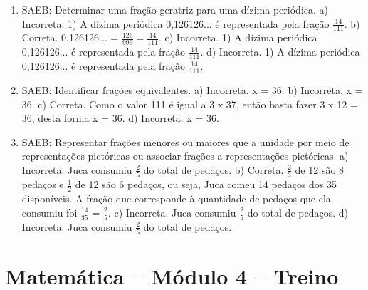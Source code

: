 \begin{enumerate}
\item
SAEB: Determinar uma fração geratriz para uma dízima periódica.
a) Incorreta. 1)  A dízima periódica 0,126126... é representada pela 
fração $\frac{14}{111}$.
b) Correta. 0,126126... = $\frac{126}{999} = \frac{14}{111}$.
c)  Incorreta. 1)  A dízima periódica 0,126126... é representada pela 
fração $\frac{14}{111}$.
d)  Incorreta. 1)  A dízima periódica 0,126126... é representada pela 
fração $\frac{14}{111}$.

\item
SAEB: Identificar frações equivalentes.
a) Incorreta. x = 36.
b) Incorreta. x = 36.
c) Correta. Como o valor 111 é igual a 3 x 37, então basta fazer 
3 x 12 = 36, desta forma x = 36.
d) Incorreta. x = 36.

\item
SAEB: Representar frações menores ou maiores que a unidade por 
meio de representações pictóricas ou associar frações a representações 
pictóricas.
a) Incorreta. Juca consumiu $\frac{2}{5}$ do total de pedaços. 
b) Correta. $\frac{2}{3}$ de 12 são 8 pedaços e $\frac{1}{2}$ de 12 são 6
pedaços, ou seja, Juca comeu 14 pedaços dos 35 disponíveis. A fração que
corresponde à quantidade de pedaços que ela consumiu foi $\frac{14}{35}$ 
= $\frac{2}{5}$.
c) Incorreta. Juca consumiu $\frac{2}{5}$ do total de pedaços.
d) Incorreta. Juca consumiu $\frac{2}{5}$ do total de pedaços.
\end{enumerate}

\section*{Matemática – Módulo 4 – Treino}

